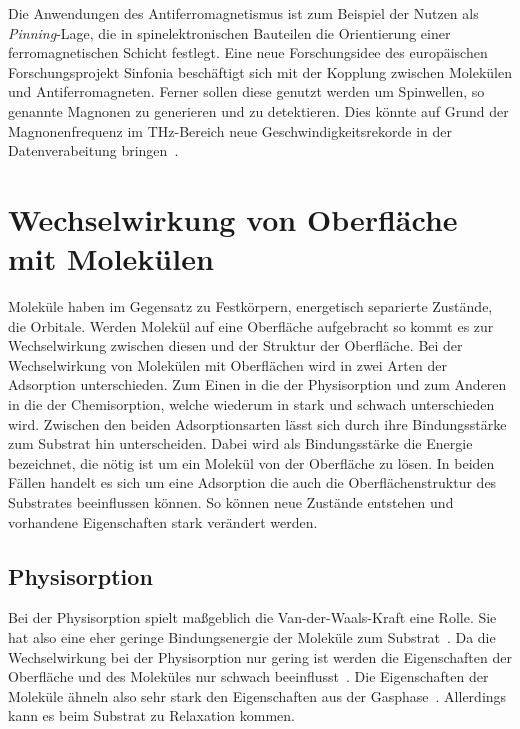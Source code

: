         Die Anwendungen des Antiferromagnetismus ist zum Beispiel der Nutzen als \textit{Pinning}-Lage, die in spinelektronischen Bauteilen die Orientierung einer ferromagnetischen Schicht festlegt.
        Eine neue Forschungsidee des europäischen Forschungsprojekt Sinfonia beschäftigt sich mit der Kopplung zwischen Molekülen und Antiferromagneten.
        Ferner sollen diese genutzt werden um Spinwellen, so genannte Magnonen zu generieren und zu detektieren.
        Dies könnte auf Grund der Magnonenfrequenz im \si{\tera\hertz}-Bereich neue Geschwindigkeitsrekorde in der Datenverabeitung bringen~\cite{SINFONIA}.
        
            
    
    \section{Wechselwirkung von Oberfläche mit Molekülen}
        Moleküle haben im Gegensatz zu Festkörpern, energetisch separierte Zustände, die Orbitale.
        Werden Molekül auf eine Oberfläche aufgebracht so kommt es zur Wechselwirkung zwischen diesen und der Struktur der Oberfläche.
        Bei der Wechselwirkung von Molekülen mit Oberflächen wird in zwei Arten der Adsorption unterschieden. 
        Zum Einen in die der Physisorption und zum Anderen in die der Chemisorption, welche wiederum in stark und schwach unterschieden wird.
        Zwischen den beiden Adsorptionsarten lässt sich durch ihre Bindungsstärke zum Substrat hin unterscheiden.
        Dabei wird als Bindungsstärke die Energie bezeichnet, die nötig ist um ein Molekül von der Oberfläche zu lösen.
        In beiden Fällen handelt es sich um eine Adsorption die auch die Oberflächenstruktur des Substrates beeinflussen können.
        So können neue Zustände entstehen und vorhandene Eigenschaften stark verändert werden.
        
        \subsection{Physisorption}
            Bei der Physisorption spielt maßgeblich die Van-der-Waals-Kraft eine Rolle.
            Sie hat also eine eher geringe Bindungsenergie der Moleküle zum Substrat~\cite{cinchetti_activating_2017}.
            Da die Wechselwirkung bei der Physisorption nur gering ist werden die Eigenschaften der Oberfläche und des Moleküles nur schwach beeinflusst~\cite{bergenti_spinterface_2019}.
            Die Eigenschaften der Moleküle ähneln also sehr stark den  Eigenschaften aus der Gasphase~\cite{cinchetti_activating_2017}.
            Allerdings kann es beim Substrat zu Relaxation kommen.

